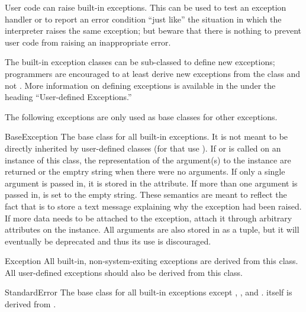 User code can raise built-in exceptions.  This can be used to test an
exception handler or to report an error condition ``just like'' the
situation in which the interpreter raises the same exception; but
beware that there is nothing to prevent user code from raising an
inappropriate error.

The built-in exception classes can be sub-classed to define new
exceptions; programmers are encouraged to at least derive new
exceptions from the  class and not
.  More
information on defining exceptions is available in the
 under the heading
``User-defined Exceptions.''


The following exceptions are only used as base classes for other
exceptions.

\begin{excdesc}{BaseException}
The base class for all built-in exceptions.  It is not meant to be directly
inherited by user-defined classes (for that use ).  If
 or  is called on an instance of this
class, the representation of the argument(s) to the instance are returned or
the emptry string when there were no arguments.  If only a single argument is
passed in, it is stored in the  attribute.  If more than one
argument is passed in,  is set to the empty string.  These
semantics are meant to reflect the fact that  is to store a
text message explaining why the exception had been raised.  If more data needs
to be attached to the exception, attach it through arbitrary attributes on the
instance.  All arguments are also stored in  as a tuple, but it will
eventually be deprecated and thus its use is discouraged.
\end{excdesc}

\begin{excdesc}{Exception}
All built-in, non-system-exiting exceptions are derived
from this class.  All user-defined exceptions should also be derived
from this class.
\end{excdesc}

\begin{excdesc}{StandardError}
The base class for all built-in exceptions except
, ,
 and .
 itself is derived from .
\end{excdesc}


